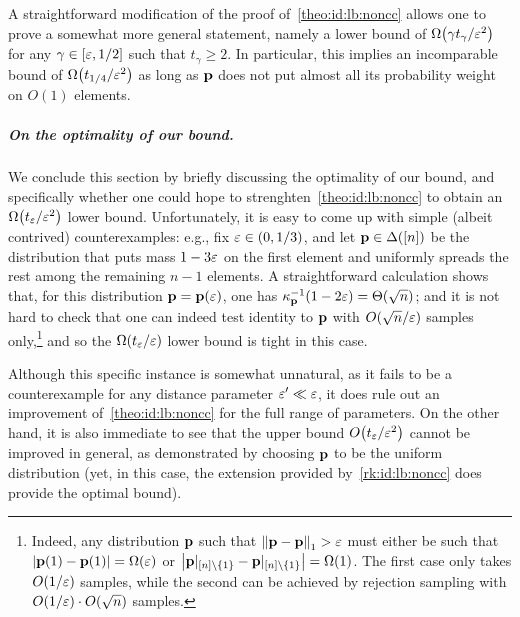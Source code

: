 \begin{remark}\label{rk:id:lb:noncc}
  A straightforward modification of the proof of~\cref{theo:id:lb:noncc} allows one to prove a somewhat more general statement, namely a lower bound of $\bigOmega{\gamma t_\gamma/\eps^2}$ for any $\gamma\in [\varepsilon, 1/2]$ such that $t_\gamma \geq 2$. In particular, this implies an incomparable bound of $\bigOmega{t_{1/4}/\eps^2}$ as long as $\mathbf{p}$ does not put almost all its probability weight on $O(1)$ elements.
\end{remark}

\subparagraph{On the optimality of our bound.}
We conclude this section by briefly discussing the optimality of our bound, and specifically whether one could hope to strenghten~\cref{theo:id:lb:noncc} to obtain an $\bigOmega{{t_{\eps}}/{\eps^2}}$ lower bound. Unfortunately, it is easy to come up with simple (albeit contrived) counterexamples: e.g., fix $\varepsilon\in(0,1/3)$, and let $\mathbf{p}\in\Delta\!\left([n]\right)$ be the distribution that puts mass $1-3\varepsilon$ on the first element and uniformly spreads the rest among the remaining $n-1$ elements. A straightforward calculation shows that, for this distribution $\mathbf{p}=\mathbf{p}(\varepsilon)$, one has $\kf{\p}^{-1}(1-2\eps) = \bigTheta{\sqrt{n}}$; and it is not hard to check that one can indeed test identity to $\mathbf{p}$ with $O(\sqrt{n}/\varepsilon)$ samples only,\footnote{Indeed, any distribution $\mathbf{p}$ such that ${\lVert\mathbf{p}-\mathbf{p}{\rVert}}_1 > \varepsilon$ must either be such that $\abs{\p(1)-\q(1)} = \bigOmega{\eps}$ or $\abs{\p|_{[n]\setminus\{1\}}-\q|_{[n]\setminus\{1\}}} = \bigOmega{1}$. The first case only takes $O(1/\varepsilon)$ samples, while the second can be achieved by rejection sampling with $O(1/\varepsilon)\cdot O(\sqrt{n})$ samples.} and so the $\bigOmega{{t_{\eps}}/{\eps}}$ lower bound is tight in this case.

Although this specific instance is somewhat unnatural, as it fails to be a counterexample for any distance parameter $\varepsilon' \ll \varepsilon$, it does rule out an improvement of~\cref{theo:id:lb:noncc} for the full range of parameters. On the other hand, it is also immediate to see that the upper bound $\bigO{{t_{\eps}}/{\eps^2}}$ cannot be improved in general, as demonstrated by choosing $\mathbf{p}$ to be the uniform distribution (yet, in this case, the extension provided by~\cref{rk:id:lb:noncc} does provide the optimal bound).  
